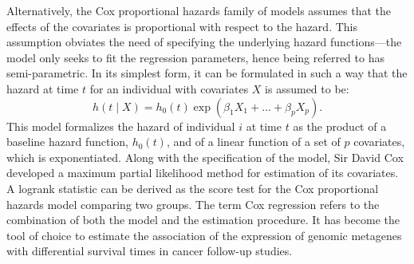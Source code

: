 
Alternatively, the Cox proportional hazards family of models assumes that the
effects of the covariates is proportional with respect to the
hazard.\cite{cox_regression_1972} This assumption obviates the need of
specifying the underlying hazard functions---the model only seeks to fit the
regression parameters, hence being referred to has semi-parametric.  In its
simplest form, it can be formulated in such a way that the hazard at time $t$
for an individual with covariates $X$ is assumed to be:
\begin{equation}
  \label{eq:proportional-hazards}
  h(t \mid X)=h_0(t) \exp(\beta_1 X_{1}+\ldots+\beta_pX_{p}).
\end{equation}
This model formalizes the hazard of individual $i$ at time $t$ as the product of
a baseline hazard function, $h_0(t)$, and of a linear function of a set of $p$
covariates, which is exponentiated.  Along with the specification of the model,
Sir David Cox developed a maximum partial likelihood method for estimation
of its covariates.\cite{cox_regression_1972} A logrank statistic can be
derived as the score test for the Cox proportional hazards model comparing two
groups.  The term Cox regression refers to the combination of both the model and
the estimation procedure.  It has become the tool of choice to estimate the
association of the expression of genomic metagenes with differential survival
times in cancer follow-up studies.



